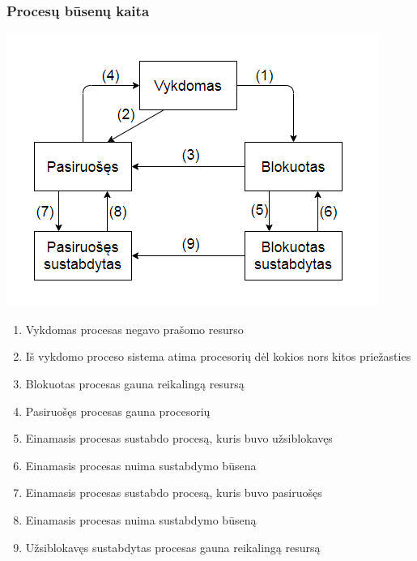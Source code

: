 \documentclass{scrartcl}
\begin{document}
      \subsubsection{Procesų būsenų kaita}
        \includegraphics[width=\textwidth]{Process_state}
        \begin{enumerate}
          \item Vykdomas procesas negavo prašomo resurso
          \item Iš vykdomo proceso sistema atima procesorių dėl kokios nors kitos priežasties
          \item Blokuotas procesas gauna reikalingą resursą
          \item Pasiruošęs procesas gauna procesorių
          \item Einamasis procesas sustabdo procesą, kuris buvo užsiblokavęs
          \item Einamasis procesas nuima sustabdymo būsena
          \item Einamasis procesas sustabdo procesą, kuris buvo pasiruošęs
          \item Einamasis procesas nuima sustabdymo būseną
          \item Užsiblokavęs sustabdytas procesas gauna reikalingą resursą
        \end{enumerate}
\end{document}
